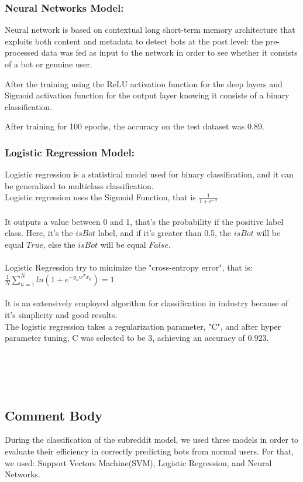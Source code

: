 \documentclass{article}
\begin{document}
    \subsubsection{Neural Networks Model:}
    
    Neural network is based on contextual long short-term memory architecture that exploits both content and metadata to detect bots at the post level: the pre-processed data was fed as  input to the network in order to see whether it consists of a bot or genuine user. 
    
    After the training using the ReLU activation function for the deep layers and Sigmoid activation function for the output layer knowing it consists of a binary classification.
    
    After training for 100 epochs, the accuracy on the test dataset was 0.89.
    
    \subsubsection{Logistic Regression Model:}
    
    Logistic regression is a statistical model used for binary classification, and it can be generalized to multiclass classification. \\
Logistic regression uses the Sigmoid Function, that is $\frac{1}{1+e^{-x}}$\\ \\ It outputs a value between 0 and 1, that's the probability if the positive label class. Here, it's the $isBot$ label, and if it's greater than 0.5, the $isBot$ will be equal $True$, else the $isBot$ will be equal $False$.  \\ \\
Logistic Regression try to minimize the "cross-entropy error", that is:\\ $\frac{1}{N} \sum_{n=1}^{N} ln(1 + e^ {-y_{n}w^Tx_n}) = 1$\\ \\
It is an extensively employed algorithm for classification in industry because of it's simplicity and good results. \\
The logistic regression takes a regularization parameter, "C", and after hyper parameter tuning, C was selected to be 3, achieving an accuracy of 0.923.  \\ \\ \\ \\ \\ 
    \subsection{Comment Body}
    During the classification of  the subreddit model, we used three models in order to evaluate their efficiency in correctly predicting bots from normal users. For that, we used: Support Vectors Machine(SVM), Logistic Regression, and Neural Networks.
    
\end{document}

